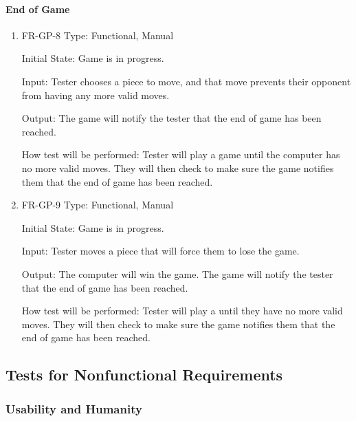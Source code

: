 \documentclass[12pt, titlepage]{article}
\begin{document}
\paragraph{End of Game}
\begin{enumerate}
    \item{FR-GP-8}
    Type: Functional, Manual
    
    Initial State: Game is in progress.
    					
    Input: Tester chooses a piece to move, and that move prevents their opponent from having any more valid moves.
    					
    Output: The game will notify the tester that the end of game has been reached.
    					
    How test will be performed: Tester will play a game until the computer has no more valid moves. They will then check to make sure the game notifies them that the end of game has been reached.
    \item{FR-GP-9}
    Type: Functional, Manual
    
    Initial State: Game is in progress.
    					
    Input: Tester moves a piece that will force them to lose the game.
    					
    Output: The computer will win the game. The game will notify the tester that the end of game has been reached.
    					
    How test will be performed: Tester will play a until they have no more valid moves. They will then check to make sure the game notifies them that the end of game has been reached.
\end{enumerate}
\subsection{Tests for Nonfunctional Requirements}

\subsubsection{Usability and Humanity}
\end{document}
